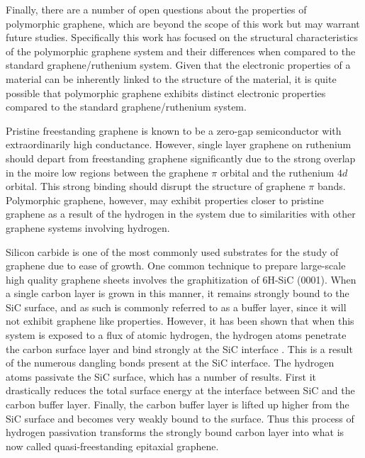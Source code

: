 Finally, there are a number of open questions about the properties of polymorphic graphene, which are beyond the scope of this work but may warrant future studies. Specifically this work has focused on the structural characteristics of the polymorphic graphene system and their differences when compared to the standard graphene/ruthenium system. Given that the electronic properties of a material can be inherently linked to the structure of the material, it is quite possible that polymorphic graphene exhibits distinct electronic properties compared to the standard graphene/ruthenium system.

Pristine freestanding graphene is known to be a zero-gap semiconductor with extraordinarily high conductance. However, single layer graphene on ruthenium should depart from freestanding graphene significantly due to the strong overlap in the moire low regions between the graphene $\pi$ orbital and the ruthenium $4d$ orbital. This strong binding should disrupt the structure of graphene $\pi$ bands. Polymorphic graphene, however, may exhibit properties closer to pristine graphene as a result of the hydrogen in the system due to similarities with other graphene systems involving hydrogen. 

Silicon carbide is one of the most commonly used substrates for the study of graphene due to ease of growth. One common technique to prepare large-scale high quality graphene sheets involves the graphitization of 6H-SiC (0001). When a single carbon layer is grown in this manner, it remains strongly bound to the SiC surface, and as such is commonly referred to as a buffer layer, since it will not exhibit graphene like properties. However, it has been shown that when this system is exposed to a flux of atomic hydrogen, the hydrogen atoms penetrate the carbon surface layer and bind strongly at the SiC interface \cite{ SiC-passivation}. This is a result of the numerous dangling bonds present at the SiC interface. The hydrogen atoms passivate the SiC surface, which has a number of results. First it drastically reduces the total surface energy at the interface between SiC and the carbon buffer layer. Finally, the carbon buffer layer is lifted up higher from the SiC surface and becomes very weakly bound to the surface. Thus this process of hydrogen passivation transforms the strongly bound carbon layer into what is now called quasi-freestanding epitaxial graphene.

